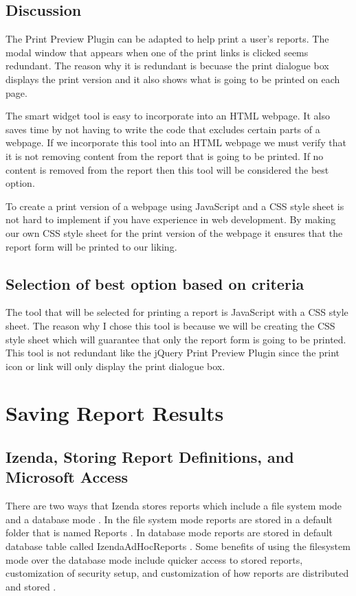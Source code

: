 \documentclass[12pt, draftclsnofoot, onecolumn]{IEEEtran}
\begin{document}
\subsection{Discussion}
The Print Preview Plugin can be adapted to help print a user's reports. The modal window that appears when one of the print links is clicked seems redundant. The reason why it is redundant is becuase the print dialogue box displays the print version and it also shows what is going to be printed on each page. 

The smart widget tool is easy to incorporate into an HTML webpage. It also saves time by not having to write the code that excludes certain parts of a webpage. If we incorporate this tool into an HTML webpage we must verify that it is not removing content from the report that is going to be printed. If no content is removed from the report then this tool will be considered the best option. 

To create a print version of a webpage using JavaScript and a CSS style sheet is not hard to implement if you have experience in web development. By making our own CSS style sheet for the print version of the webpage it ensures that the report form will be printed to our liking. 


\subsection{Selection of best option based on criteria} 
The tool that will be selected for printing a report is JavaScript with a CSS style sheet. The reason why I chose this tool is because we will be creating the CSS style sheet which will guarantee that only the report form is going to be printed. This tool is not redundant like the jQuery Print Preview Plugin since the print icon or link will only display the print dialogue box. 

\section{Saving Report Results}

\subsection{Izenda, Storing Report Definitions, and Microsoft Access}
There are two ways that Izenda stores reports which include a file system mode and a database mode \cite{Adams}. In the file system mode reports are stored in a default folder that is named Reports \cite{Adams}. In database mode reports are stored in default database table called IzendaAdHocReports \cite{}. Some benefits of using the filesystem mode over the database mode include quicker access to stored reports, customization of security setup, and customization of how reports are distributed and stored \cite{Adams}. 
\end{document}
